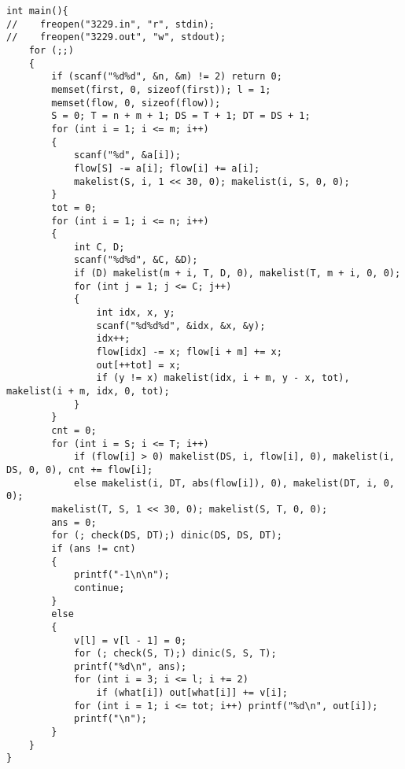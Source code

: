 \begin{lstlisting}
int main(){
//    freopen("3229.in", "r", stdin);
//    freopen("3229.out", "w", stdout);
    for (;;)
    {
        if (scanf("%d%d", &n, &m) != 2) return 0;
        memset(first, 0, sizeof(first)); l = 1;
        memset(flow, 0, sizeof(flow));
        S = 0; T = n + m + 1; DS = T + 1; DT = DS + 1;
        for (int i = 1; i <= m; i++) 
        {
            scanf("%d", &a[i]);
            flow[S] -= a[i]; flow[i] += a[i];
            makelist(S, i, 1 << 30, 0); makelist(i, S, 0, 0);
        }
        tot = 0;
        for (int i = 1; i <= n; i++)
        {
            int C, D;
            scanf("%d%d", &C, &D);
            if (D) makelist(m + i, T, D, 0), makelist(T, m + i, 0, 0);
            for (int j = 1; j <= C; j++)
            {
                int idx, x, y;
                scanf("%d%d%d", &idx, &x, &y);
                idx++;
                flow[idx] -= x; flow[i + m] += x;
                out[++tot] = x;
                if (y != x) makelist(idx, i + m, y - x, tot), makelist(i + m, idx, 0, tot);
            }
        }
        cnt = 0;
        for (int i = S; i <= T; i++)
            if (flow[i] > 0) makelist(DS, i, flow[i], 0), makelist(i, DS, 0, 0), cnt += flow[i];
            else makelist(i, DT, abs(flow[i]), 0), makelist(DT, i, 0, 0);
        makelist(T, S, 1 << 30, 0); makelist(S, T, 0, 0);
        ans = 0;
        for (; check(DS, DT);) dinic(DS, DS, DT);
        if (ans != cnt) 
        {
            printf("-1\n\n");
            continue;
        }
        else
        {
            v[l] = v[l - 1] = 0;
            for (; check(S, T);) dinic(S, S, T);
            printf("%d\n", ans);
            for (int i = 3; i <= l; i += 2)
                if (what[i]) out[what[i]] += v[i];
            for (int i = 1; i <= tot; i++) printf("%d\n", out[i]);
            printf("\n");
        }
    }
}
\end{lstlisting}
